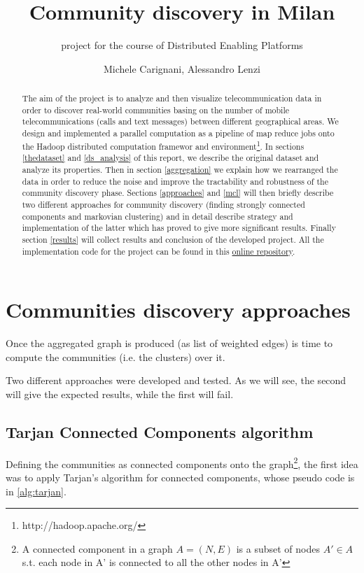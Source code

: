 \documentclass[12pt,a4paper]{article}
\author{Michele Carignani, Alessandro Lenzi}
\title{Community discovery in Milan}
\subtitle{project for the course of Distributed Enabling Platforms}
\begin{document}
\maketitle
\tableofcontents

\begin{abstract}
The aim of the project is to analyze and then visualize telecommunication data
in order to discover real-world communities basing on the number of mobile telecommunications (calls and text messages) 
between different geographical areas. We design and implemented 
a parallel computation as a pipeline of
map reduce jobs onto the Hadoop distributed computation
framewor and environment\footnote{http://hadoop.apache.org/}.
In sections \ref{thedataset} and \ref{ds_analysis} of this report, we describe the original dataset
and analyze its properties. Then in section \ref{aggregation}
we explain how we rearranged the data in
order to reduce the noise and improve the tractability and robustness of the
community discovery phase. Sections \ref{approaches} and \ref{mcl} will then
briefly describe two different approaches for community discovery
(finding strongly connected components and markovian clustering)
and in detail describe strategy and implementation of the latter which has
proved to give more significant results.
Finally section \ref{results} will collect results and conclusion of the developed project.
All the implementation code for the project can be found in this
\href{''https://github.com/michele-carignani/hadoop-markov-clustering/''}{online repository}.
\end{abstract}








\section{Communities discovery approaches}
\label{approaches}

Once the aggregated graph is produced (as list of weighted edges) is time to compute
the communities (i.e. the clusters) over it.

Two different approaches were developed and tested. 
As we will see, the second will give the
expected results, while the first will fail.

\subsection{Tarjan Connected Components algorithm}
Defining the communities as connected components onto the graph\footnote{A connected component
in a graph $A = (N,E)$ is a subset of nodes $A' \in A$  s.t. each node in A' is connected to 
all the other nodes in A' 
}, the first idea was to apply Tarjan's algorithm for connected components, whose pseudo code is in \ref{alg:tarjan}.
\end{document}
